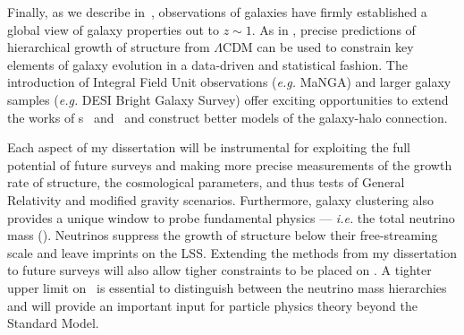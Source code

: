 
Finally, as we describe in~, observations of galaxies have 
firmly established a global view of galaxy properties out to $z{\sim}1$. 
As in , precise predictions of hierarchical growth of 
structure from $\Lambda$CDM can be used to constrain key elements of 
galaxy evolution in a data-driven and statistical fashion. The introduction 
of Integral Field Unit observations (\emph{e.g.} MaNGA) and larger 
galaxy samples (\emph{e.g.} DESI Bright Galaxy Survey) offer exciting 
opportunities to extend the works of \chapname s~ and~
and construct better models of the galaxy-halo connection.

Each aspect of my dissertation will be instrumental for exploiting the full 
potential of future surveys and making more precise measurements of the growth
rate of structure, the cosmological parameters, and thus tests of General Relativity 
and modified gravity scenarios. 
Furthermore, galaxy clustering also provides a unique window to probe 
fundamental physics --- {\em i.e.} the total neutrino mass (\mneut). Neutrinos 
suppress the growth of structure below their free-streaming scale and leave 
imprints on the LSS. Extending the methods from my dissertation to future 
surveys will also allow tigher constraints to be placed on \mneut. A tighter 
upper limit on \mneut ~is essential to distinguish between the neutrino mass 
hierarchies and will provide an important input for particle physics theory 
beyond the Standard Model.
